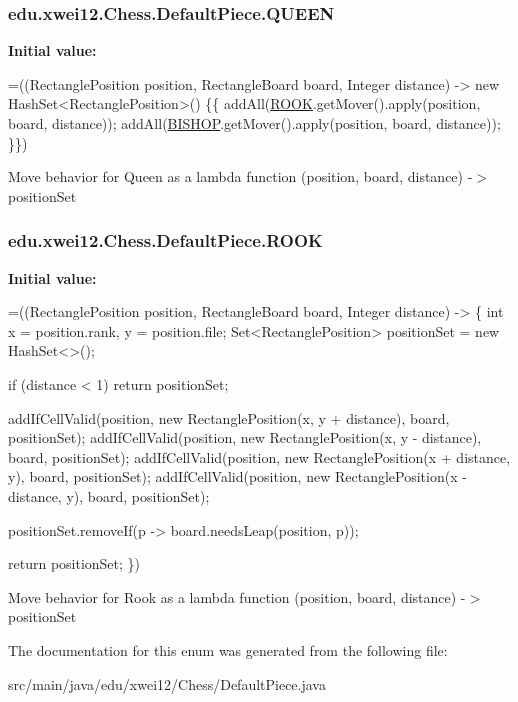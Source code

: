 \subsubsection[{\texorpdfstring{Q\+U\+E\+EN}{QUEEN}}]{\setlength{\rightskip}{0pt plus 5cm}edu.\+xwei12.\+Chess.\+Default\+Piece.\+Q\+U\+E\+EN}\hypertarget{enumedu_1_1xwei12_1_1_chess_1_1_default_piece_a2d54c1d306a8e1259ff5c807de83e3f8}{}\label{enumedu_1_1xwei12_1_1_chess_1_1_default_piece_a2d54c1d306a8e1259ff5c807de83e3f8}
{\bfseries Initial value\+:}
\begin{DoxyCode}
=((RectanglePosition position, RectangleBoard board, Integer distance) -> \textcolor{keyword}{new} HashSet<RectanglePosition>() 
      \{\{
        addAll(\hyperlink{enumedu_1_1xwei12_1_1_chess_1_1_default_piece_acf677d8474e2029483774f08f3845b9b}{ROOK}.getMover().apply(position, board, distance));
        addAll(\hyperlink{enumedu_1_1xwei12_1_1_chess_1_1_default_piece_a126cf1ab581b587e90738827ef4f7782}{BISHOP}.getMover().apply(position, board, distance));
    \}\})
\end{DoxyCode}
Move behavior for Queen as a lambda function (position, board, distance) -\/$>$ position\+Set 
\subsubsection[{\texorpdfstring{R\+O\+OK}{ROOK}}]{\setlength{\rightskip}{0pt plus 5cm}edu.\+xwei12.\+Chess.\+Default\+Piece.\+R\+O\+OK}\hypertarget{enumedu_1_1xwei12_1_1_chess_1_1_default_piece_acf677d8474e2029483774f08f3845b9b}{}\label{enumedu_1_1xwei12_1_1_chess_1_1_default_piece_acf677d8474e2029483774f08f3845b9b}
{\bfseries Initial value\+:}
\begin{DoxyCode}
=((RectanglePosition position, RectangleBoard board, Integer distance) -> \{
        \textcolor{keywordtype}{int} x = position.rank, y = position.file;
        Set<RectanglePosition> positionSet = \textcolor{keyword}{new} HashSet<>();

        
        \textcolor{keywordflow}{if} (distance < 1) \textcolor{keywordflow}{return} positionSet;

        
        addIfCellValid(position, \textcolor{keyword}{new} RectanglePosition(x, y + distance), board, positionSet);
        addIfCellValid(position, \textcolor{keyword}{new} RectanglePosition(x, y - distance), board, positionSet);
        addIfCellValid(position, \textcolor{keyword}{new} RectanglePosition(x + distance, y), board, positionSet);
        addIfCellValid(position, \textcolor{keyword}{new} RectanglePosition(x - distance, y), board, positionSet);

        
        positionSet.removeIf(p -> board.needsLeap(position, p));

        \textcolor{keywordflow}{return} positionSet;
    \})
\end{DoxyCode}
Move behavior for Rook as a lambda function (position, board, distance) -\/$>$ position\+Set 

The documentation for this enum was generated from the following file\+:\begin{DoxyCompactItemize}
\item 
src/main/java/edu/xwei12/\+Chess/Default\+Piece.\+java\end{DoxyCompactItemize}

